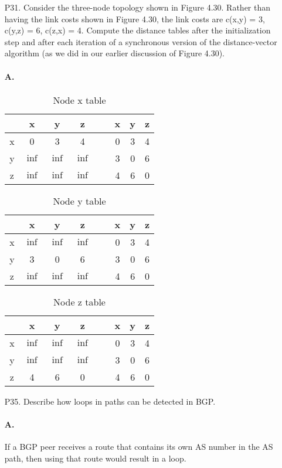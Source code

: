\documentclass[]{article}
\begin{document}
\begin{enumerate}
		\item[P31.] 
		Consider the three-node topology shown in Figure 4.30. Rather than having the link costs shown in Figure 4.30, the link costs are c(x,y) = 3, c(y,z) = 6, c(z,x) = 4. Compute the distance tables after the initialization step and after each iteration of a synchronous version of the distance-vector algorithm (as	we did in our earlier discussion of Figure 4.30).
		\begin{figure}[H]
			\centering
			
			\caption{}
			\label{fig:5}
		\end{figure}
		\paragraph{A.}
		\begin{table}[H]
			\centering
			\caption{Node x table}
			\begin{tabular}{cccc||cccc}
				~ & x & y & z & ~ & x & y & z \\\hline
				x & 0 & 3 & 4 & ~ & 0 & 3 & 4 \\
				y & $\inf$ & $\inf$ & $\inf$ & ~ & 3 & 0 & 6 \\
				z & $\inf$ & $\inf$ & $\inf$ & ~ & 4 & 6 & 0
			\end{tabular}
		\end{table}
		\begin{table}[H]
			\centering
			\caption{Node y table}
			\begin{tabular}{cccc||cccc}
				~ & x & y & z & ~ & x & y & z \\\hline
				x & $\inf$ & $\inf$ & $\inf$ & ~ & 0 & 3 & 4 \\
				y & 3 & 0 & 6 & ~ & 3 & 0 & 6 \\
				z & $\inf$ & $\inf$ & $\inf$ & ~ & 4 & 6 & 0
			\end{tabular}
		\end{table}
		\begin{table}[H]
			\centering
			\caption{Node z table}
			\begin{tabular}{cccc||cccc}
				~ & x & y & z & ~ & x & y & z \\\hline
				x & $\inf$ & $\inf$ & $\inf$ & ~ & 0 & 3 & 4 \\
				y & $\inf$ & $\inf$ & $\inf$ & ~ & 3 & 0 & 6 \\
				z & 4 & 6 & 0 & ~ & 4 & 6 & 0
			\end{tabular}
		\end{table}
		
		\item[P35.] Describe how loops in paths can be detected in BGP.
		\paragraph{A.}
		If a BGP peer receives a route that contains its own AS number in the AS path, then using that route would result in a loop.
	\end{enumerate}
\end{document}

